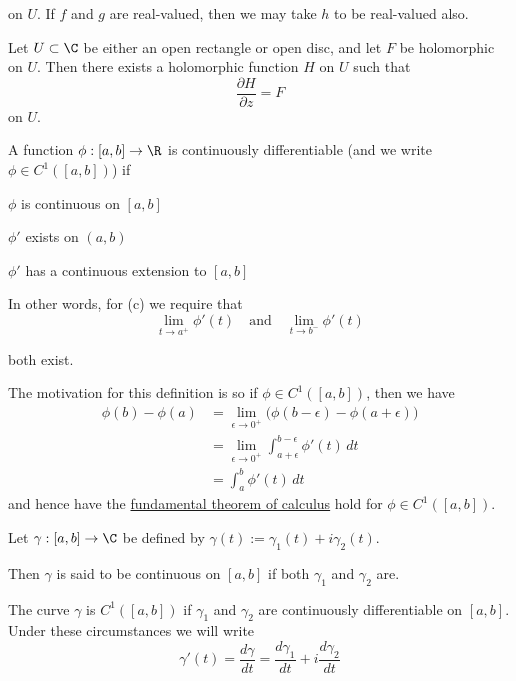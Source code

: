 on $U$. If $f$ and $g$ are real-valued, then we may take $h$ to be real-valued
also.

\label{e7808d1}

Let $U\subset\C$ be either an open rectangle or open disc, and let $F$ be
holomorphic on $U$. Then there exists a holomorphic function $H$ on $U$ such
that
$$
  \frac{\partial H}{\partial z}=F
$$
on $U$.

\label{c1f6d35}

A function $\phi:[a,b]\to\R$ is continuously differentiable (and we write
$\phi\in C^1([a,b])$) if

\begin{enumerata}
  \item $\phi$ is continuous on $[a,b]$
  \item $\phi'$ exists on $(a,b)$
  \item $\phi'$ has a continuous extension to $[a,b]$
\end{enumerata}

In other words, for (c) we require that
$$
  \lim_{t\to a^+}\phi'(t)\quad\text{and}\quad\lim_{t\to b^-}\phi'(t)
$$

both exist.

The motivation for this definition is so if $\phi\in C^1([a,b])$, then we have
\begin{align*}
  \phi(b)-\phi(a)
   &=\lim_{\epsilon\to0^+}\big(\phi(b-\epsilon)-\phi(a+\epsilon)\big) \\
   &=\lim_{\epsilon\to0^+}\int_{a+\epsilon}^{b-\epsilon}\phi'(t)\,dt  \\
   &=\int_a^b\phi'(t)\,dt
\end{align*}
and hence have the \href{b869dc0}{fundamental theorem of calculus}
hold for $\phi\in C^1([a,b])$.

\label{e4132bc}

Let $\gamma:[a,b]\to\C$ be defined by $\gamma(t):=\gamma_1(t) + i\gamma_2(t)$.

Then $\gamma$ is said to be continuous on $[a,b]$ if both $\gamma_1$ and
$\gamma_2$ are.

The curve $\gamma$ is $C^1([a,b])$ if $\gamma_1$ and $\gamma_2$ are
continuously differentiable on $[a,b]$. Under these circumstances we will write
$$
  \gamma'(t)=\frac{d\gamma}{dt}=\frac{d\gamma_1}{dt}+i\frac{d\gamma_2}{dt}
$$

\label{c511702}

